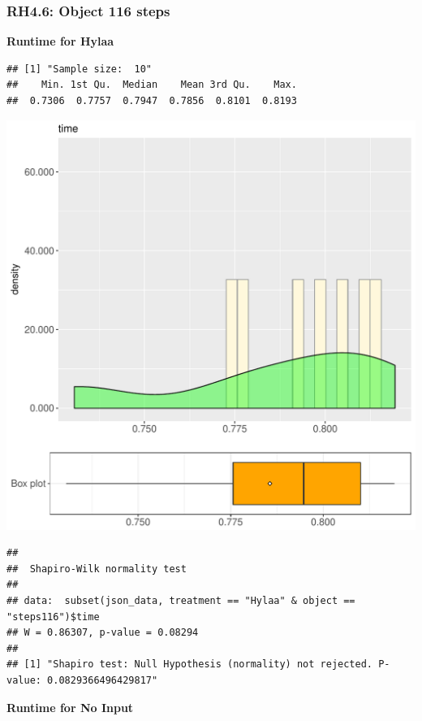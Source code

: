 \documentclass{article}\usepackage[]{graphicx}\usepackage[]{color}
\makeatletter
\def\maxwidth{ %
  \ifdim\Gin@nat@width>\linewidth
    \linewidth
  \else
    \Gin@nat@width
  \fi
}
\newenvironment{kframe}{%
 \def\at@end@of@kframe{}%
 \ifinner\ifhmode%
  \def\at@end@of@kframe{\end{minipage}}%
  \begin{minipage}{\columnwidth}%
 \fi\fi%
 \def\FrameCommand##1{\hskip\@totalleftmargin \hskip-\fboxsep
 \colorbox{shadecolor}{##1}\hskip-\fboxsep
     \hskip-\linewidth \hskip-\@totalleftmargin \hskip\columnwidth}%
 \MakeFramed {\advance\hsize-\width
   \@totalleftmargin\z@ \linewidth\hsize
   \@setminipage}}%
 {\par\unskip\endMakeFramed%
 \at@end@of@kframe}
\newenvironment{knitrout}{}{} %
\makeatother
\begin{document}
\subsubsection{RH4.6: Object 116 steps}

 \textbf{Runtime for Hylaa}
\begin{knitrout}
\color{fgcolor}\begin{kframe}
\begin{verbatim}
## [1] "Sample size:  10"
##    Min. 1st Qu.  Median    Mean 3rd Qu.    Max. 
##  0.7306  0.7757  0.7947  0.7856  0.8101  0.8193
\end{verbatim}
\end{kframe}
\includegraphics[width=\maxwidth]{figure/RH4_Hylaa_steps116-1} 
\begin{kframe}\begin{verbatim}
## 
## 	Shapiro-Wilk normality test
## 
## data:  subset(json_data, treatment == "Hylaa" & object == "steps116")$time
## W = 0.86307, p-value = 0.08294
## 
## [1] "Shapiro test: Null Hypothesis (normality) not rejected. P-value: 0.0829366496429817"
\end{verbatim}
\end{kframe}
\end{knitrout}
 \textbf{Runtime for No Input}
\end{document}
